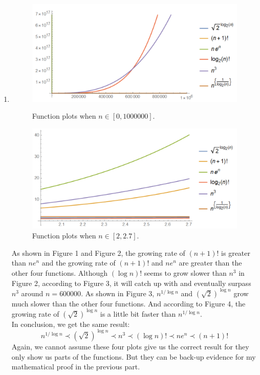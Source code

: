 \documentclass[12pt,a4paper]{article}
\makeatletter
\newtheorem*{solution}{Solution}
\theoremstyle{definition}
\renewenvironment{solution}[1][Solution] {\par\pushQED{\qed}\normalfont\topsep6\p@\@plus6\p@\relax\trivlist\item[\hskip\labelsep\bfseries#1\@addpunct{.}]\ignorespaces}{\popQED\endtrivlist\@endpefalse} \makeatother
\makeatother
\begin{document}
\begin{enumerate}
\begin{solution}
\begin{figure}[htbp]
\begin{minipage}[h]{0.5\textwidth}
\centering
\includegraphics[width=1\textwidth]{f3.png}
\caption{Function plots when $n\in[0,1000000]$.} 
\end{minipage}
\begin{minipage}[h]{0.5\textwidth}
\centering
\includegraphics[width=1\textwidth]{f4.png}
\caption{Function plots when $n\in[2,2.7]$.} 
\end{minipage}
\end{figure}
As shown in Figure 1 and Figure 2, the growing rate of $(n+1)!$ is greater than $ne^n$ and the growing rate of $(n+1)!$ and $ne^n$ are greater than the other four functions. Although $(\log n)!$ seems to grow slower than $n^3$ in Figure 2, according to Figure 3, it will catch up with and eventually surpass $n^3$ around $n=600000$. As shown in Figure 3, $n^{1/\log n}$ and $(\sqrt{2})^{\log n}$ grow much slower than the other four functions. And according to Figure 4, the growing rate of $(\sqrt{2})^{\log n}$ is a little bit faster than $n^{1/\log n}$.\\
In conclusion, we get the same result:
$$n^{1/\log n}\prec(\sqrt{2})^{\log n}\prec n^3\prec (\log n)!\prec ne^n\prec (n+1)!$$
Again, we cannot assume these four plots give us the correct result for they only show us parts of the functions. But they can be back-up evidence for my mathematical proof in the previous part.
\end{solution}

\end{enumerate}

\end{document}
